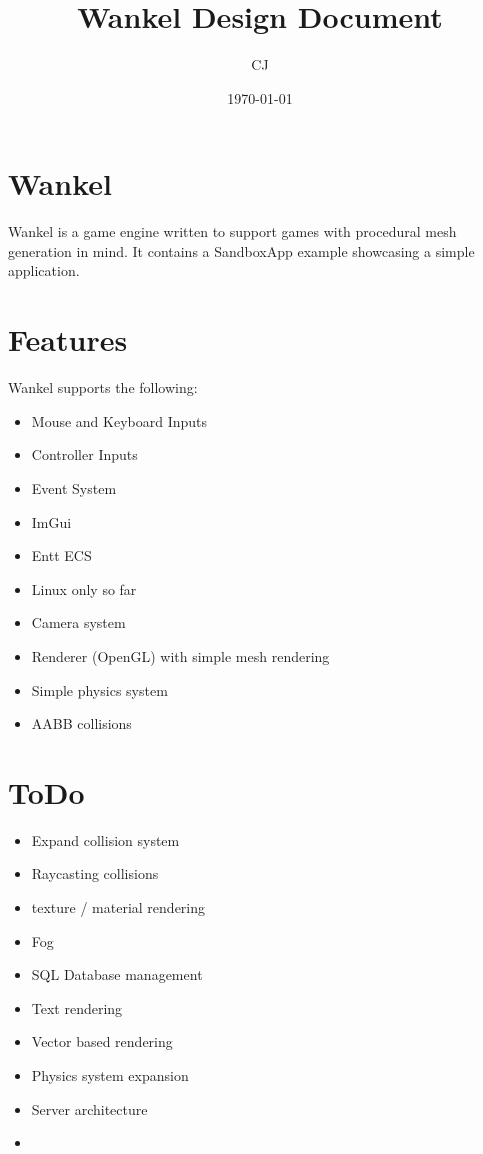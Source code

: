 \documentclass{article}
\title{Wankel Design Document}
\author{CJ}
\date{\today}
\begin{document}
\maketitle

\section{Wankel}

Wankel is a game engine written to support games with procedural mesh generation in mind. It contains a SandboxApp example showcasing a simple application.

\section{Features}

Wankel supports the following:

\begin{itemize}
    \item Mouse and Keyboard Inputs
    \item Controller Inputs
    \item Event System
    \item ImGui
    \item Entt ECS 
    \item Linux only so far
    \item Camera system
    \item Renderer (OpenGL) with simple mesh rendering
    \item Simple physics system
    \item AABB collisions

\end{itemize}

\section{ToDo}

\begin{itemize}
    \item Expand collision system
    \item Raycasting collisions
    \item texture / material rendering
    \item Fog
    \item SQL Database management
    \item Text rendering
    \item Vector based rendering
    \item Physics system expansion
    \item Server architecture
    \item 
\end{itemize}
\end{document}
